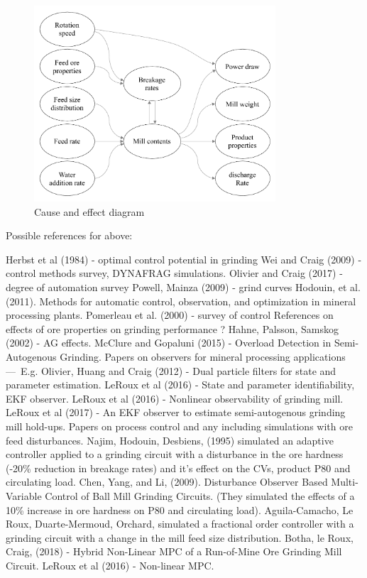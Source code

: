 \begin{figure}[htp] \label{fig:cause-effect}
	\centering
	\includegraphics[width=9cm]{images/cause-effect.pdf}
	\caption{Cause and effect diagram}
\end{figure}

Possible references for above:
\begin{outline}
	\1 Herbst et al (1984) - optimal control potential in grinding
	\1 Wei and Craig (2009) - control methods survey, DYNAFRAG simulations.
	\1 Olivier and Craig (2017) - degree of automation survey
	\1 Powell, Mainza (2009) - grind curves
	\1 Hodouin, et al. (2011). Methods for automatic control, observation, and optimization in mineral processing plants.
	\1 Pomerleau et al. (2000) - survey of control
	\1 References on effects of ore properties on grinding performance ?
	\2 Hahne, Palsson, Samskog (2002) - AG effects.
	\1 McClure and Gopaluni (2015) - Overload Detection in Semi-Autogenous Grinding.
	\1 Papers on observers for mineral processing applications — E.g. 
	\2 Olivier, Huang and Craig (2012) - Dual particle filters for state and parameter estimation.
	\2 LeRoux et al (2016) - State and parameter identifiability, EKF observer.
	\2 LeRoux et al (2016) - Nonlinear observability of grinding mill.
	\2 LeRoux et al (2017) - An EKF observer to estimate semi-autogenous grinding mill hold-ups.
	\1 Papers on process control and any including simulations with ore feed disturbances.
	\2 Najim, Hodouin, Desbiens, (1995) simulated an adaptive controller applied to a grinding circuit with a disturbance in the ore hardness (-20\% reduction in breakage rates) and it's effect on the CVs, product P80 and circulating load.
	\2 Chen, Yang, and Li, (2009). Disturbance Observer Based Multi-Variable Control of Ball Mill Grinding Circuits. (They simulated the effects of a 10\% increase in ore hardness on P80 and circulating load).
	\2 Aguila-Camacho, Le Roux, Duarte-Mermoud, Orchard, simulated a fractional order controller with a grinding circuit with a change in the mill feed size distribution.
	\2 Botha, le Roux, Craig, (2018) - Hybrid Non-Linear MPC of a Run-of-Mine Ore Grinding Mill Circuit.
	\2 LeRoux et al (2016) - Non-linear MPC.
\end{outline}


